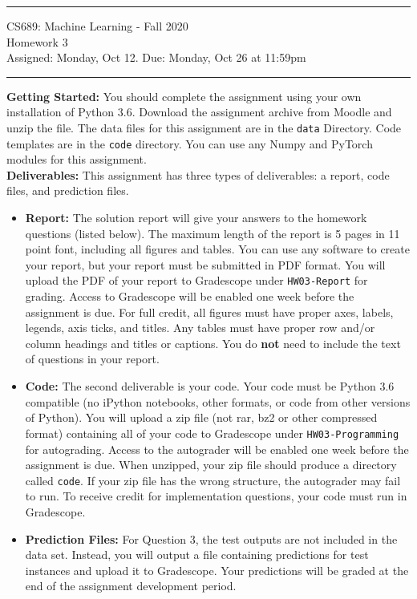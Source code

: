 \documentclass[11pt]{article}
\begin{document}
{\centering
  \rule{6.3in}{2pt}
  \vspace{1em}
  {\Large
    CS689: Machine Learning - Fall 2020\\
    Homework 3\\
  }
  \vspace{1em}
  Assigned: Monday, Oct 12. Due: Monday, Oct 26 at 11:59pm \\
  \vspace{0.1em}
  \rule{6.3in}{1.5pt}
}
\vspace{1pc}

\textbf{Getting Started:} You should complete the assignment using your own installation of Python 3.6. Download the assignment archive from Moodle and unzip the file. The data files for this assignment are in the \verb|data| Directory. Code templates are in the \verb|code| directory. You can use any Numpy and PyTorch modules for this assignment.\\

\textbf{Deliverables:} This assignment has three types of deliverables: a report, code files, and prediction files.
\begin{itemize}
\item \textbf{Report: } The solution report will give your answers to the homework questions (listed below). The maximum length of the report is 5 pages in 11 point font, including all figures and tables. You can use any software to create your report, but your report must be submitted in PDF format. You will upload the PDF of your report to Gradescope under \verb|HW03-Report| for grading. Access to Gradescope will be enabled one week before the assignment is due. For full credit, all figures must have proper axes, labels, legends, axis ticks, and titles. Any tables must have proper row and/or column headings and titles or captions. You do \textbf{not} need to include the text of questions in your report.

\item \textbf{Code: } The second deliverable is your code. Your code must be Python 3.6 compatible (no iPython notebooks, other formats, or code from other versions of Python). You will upload a zip file (not rar, bz2 or other compressed format) containing all of your code to Gradescope under \verb|HW03-Programming| for autograding. Access to the autograder will be enabled one week before the assignment is due. When unzipped, your zip file should produce a directory called \verb|code|.  If your zip file has the wrong structure, the autograder may fail to run. To receive credit for implementation questions, your code must run in Gradescope. 

\item \textbf{Prediction Files: } For Question 3, the test outputs are not included in the data set. Instead, you will output a file containing predictions for test instances and upload it to Gradescope. Your predictions will be graded at the end of the assignment development period.
\end{itemize}
\end{document}

